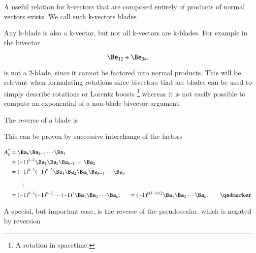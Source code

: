 %
%


A useful relation for k-vectors that are composed entirely of products of normal vectors exists.  We call such k-vectors blades


Any k-blade is also a k-vector, but not all k-vectors are k-blades.  For example in  the bivector

\begin{dmath}\label{eqn:reverse:n}
\Be_{12} + \Be_{34},
\end{dmath}

is not a 2-blade, since it cannot be factored into normal products.
This will be relevant when formulating rotations since bivectors that are blades can be used to simply describe rotations or Lorentz boosts
\footnote{A rotation in spacetime.} whereas it is not easily possible to compute an exponential of a non-blade bivector argument.

The reverse of a blade is


This can be proven by successive interchange of the factors

\begin{dmath}\label{eqn:scalarPermutation:81}
\begin{aligned}
A_k^\dagger
&= \Ba_k \Ba_{k-1} \cdots \Ba_1 \\
&= (-1)^{k-1} \Ba_1 \Ba_k \Ba_{k-1} \cdots \Ba_2 \\
&= (-1)^{k-1} (-1)^{k-2} \Ba_1 \Ba_2 \Ba_k \Ba_{k-1} \cdots \Ba_3 \\
&\qquad \vdots \\
&= (-1)^{k-1} (-1)^{k-2} \cdots (-1)^1 \Ba_1 \Ba_2 \cdots \Ba_k,
&= (-1)^{k(k-1)/2} \Ba_1 \Ba_2 \cdots \Ba_k. \qquad \qedmarker
\end{aligned}
\end{dmath}

A special, but important case, is the reverse of the  pseudoscalar, which is negated by reversion


